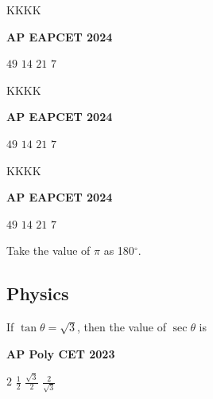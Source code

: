 \documentclass[11pt,paper=a4,answers]{exam}
\begin{document}
\begin{multicols}{2}
\begin{questions}
\question
KKKK
\begin{flushright}
\small\textbf{AP EAPCET 2024}
\end{flushright}
\begin{choices}
  \choice $49$ 
  \choice $14$ 
  \choice $21$ 
  \choice $7$ 
\end{choices}


\question
KKKK
\begin{flushright}
\small\textbf{AP EAPCET 2024}
\end{flushright}
\begin{choices}
  \choice $49$ 
  \choice $14$ 
  \choice $21$ 
  \choice $7$ 
\end{choices}


\question
KKKK
\begin{flushright}
\small\textbf{AP EAPCET 2024}
\end{flushright}
\begin{choices}
  \choice $49$ 
  \choice $14$ 
  \choice $21$ 
  \choice $7$ 
\end{choices}





\end{questions}
\end{multicols}

\begin{center}
  \Large{Take the value of $\pi$ as 180${^\circ}$.}
\end{center}

\newpage



\subsection*{Physics}
\begin{multicols}{2}
\begin{questions}
\question
If $\tan  \theta = \sqrt{3}$, then the value of $\sec \theta$ is
\begin{flushright}
\small\textbf{AP Poly CET 2023}
\end{flushright}


\begin{choices}
\choice $\displaystyle 2$ 
\choice $\displaystyle \frac{1}{2}$ 
\choice $\displaystyle \frac{\sqrt{3}}{2}$ 
\choice $\displaystyle \frac{2}{\sqrt{3}}$  
\end{choices}
\end{questions}

\end{multicols}
\end{document}
